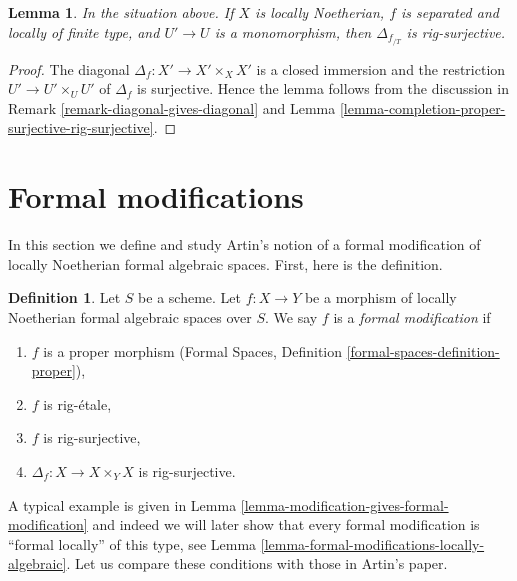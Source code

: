 \documentclass{stacks-project}
\theoremstyle{plain}
\newtheorem{lemma}[subsection]{Lemma}
\theoremstyle{definition}
\newtheorem{definition}[subsection]{Definition}
\theoremstyle{remark}
\numberwithin{equation}{subsection}
\begin{document}
\begin{lemma}
\label{lemma-separated-mono-open-diagonal-rig-surjective}
In the situation above. If $X$ is locally Noetherian,
$f$ is separated and locally of finite type, and $U' \to U$ is
a monomorphism, then $\Delta_{f_{/T}}$ is rig-surjective.
\end{lemma}

\begin{proof}
The diagonal $\Delta_f : X' \to X' \times_X X'$ is a closed
immersion and the restriction $U' \to U' \times_U U'$ of $\Delta_f$
is surjective. Hence the lemma follows from the discussion in
Remark \ref{remark-diagonal-gives-diagonal} and
Lemma \ref{lemma-completion-proper-surjective-rig-surjective}.
\end{proof}












\section{Formal modifications}
\label{section-formal-modifications}

\noindent
In this section we define and study Artin's notion of a formal modification
of locally Noetherian formal algebraic spaces. First, here is the
definition.

\begin{definition}
\label{definition-formal-modification}
Let $S$ be a scheme. Let $f : X \to Y$ be a morphism of
locally Noetherian formal algebraic spaces over $S$. We say $f$ is a
{\it formal modification} if
\begin{enumerate}
\item $f$ is a proper morphism (Formal Spaces, Definition
\ref{formal-spaces-definition-proper}),
\item $f$ is rig-\'etale,
\item $f$ is rig-surjective,
\item $\Delta_f : X \to X \times_Y X$ is rig-surjective.
\end{enumerate}
\end{definition}

\noindent
A typical example is given in
Lemma \ref{lemma-modification-gives-formal-modification}
and indeed we will later show that every formal modification is
``formal locally'' of this type, see
Lemma \ref{lemma-formal-modifications-locally-algebraic}.
Let us compare these conditions with those in Artin's paper.
\end{document}
